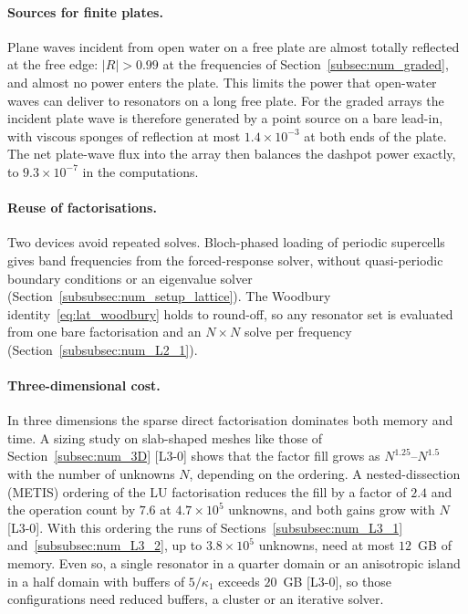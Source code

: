 {\paragraph{Sources for finite plates.} Plane waves incident from open water on a free plate are almost totally reflected at the free edge: $|R|>0.99$ at the frequencies of Section~\ref{subsec:num_graded}, and almost no power enters the plate. This limits the power that open-water waves can deliver to resonators on a long free plate. For the graded arrays the incident plate wave is therefore generated by a point source on a bare lead-in, with viscous sponges of reflection at most $1.4\times10^{-3}$ at both ends of the plate. The net plate-wave flux into the array then balances the dashpot power exactly, to $9.3\times10^{-7}$ in the computations.

\paragraph{Reuse of factorisations.} Two devices avoid repeated solves. Bloch-phased loading of periodic supercells gives band frequencies from the forced-response solver, without quasi-periodic boundary conditions or an eigenvalue solver (Section~\ref{subsubsec:num_setup_lattice}). The Woodbury identity~\eqref{eq:lat_woodbury} holds to round-off, so any resonator set is evaluated from one bare factorisation and an $N\times N$ solve per frequency (Section~\ref{subsubsec:num_L2_1}).

\paragraph{Three-dimensional cost.} In three dimensions the sparse direct factorisation dominates both memory and time. A sizing study on slab-shaped meshes like those of Section~\ref{subsec:num_3D} [L3-0] shows that the factor fill grows as $N^{1.25}$--$N^{1.5}$ with the number of unknowns $N$, depending on the ordering. A nested-dissection (METIS) ordering of the LU factorisation reduces the fill by a factor of $2.4$ and the operation count by $7.6$ at $4.7\times10^5$ unknowns, and both gains grow with $N$ [L3-0]. With this ordering the runs of Sections~\ref{subsubsec:num_L3_1} and~\ref{subsubsec:num_L3_2}, up to $3.8\times10^5$ unknowns, need at most $12$~GB of memory. Even so, a single resonator in a quarter domain or an anisotropic island in a half domain with buffers of $5/\kappa_1$ exceeds $20$~GB [L3-0], so those configurations need reduced buffers, a cluster or an iterative solver.

}
